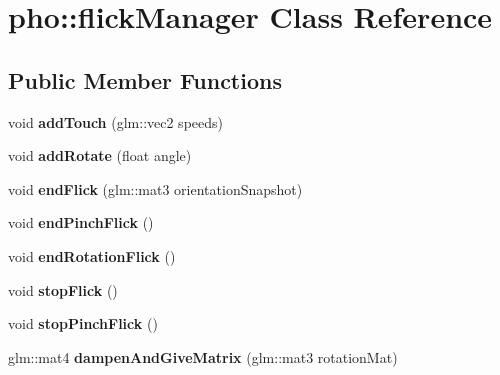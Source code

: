 \hypertarget{classpho_1_1flickManager}{\section{pho\-:\-:flick\-Manager Class Reference}
\label{classpho_1_1flickManager}
}
\subsection*{Public Member Functions}
\begin{DoxyCompactItemize}
\item 
\hypertarget{classpho_1_1flickManager_ad9f5cb98e758564c5ebc913d9aa120d1}{void {\bfseries add\-Touch} (glm\-::vec2 speeds)}\label{classpho_1_1flickManager_ad9f5cb98e758564c5ebc913d9aa120d1}

\item 
\hypertarget{classpho_1_1flickManager_a1b1df3626e566e118b936ad3e4005243}{void {\bfseries add\-Rotate} (float angle)}\label{classpho_1_1flickManager_a1b1df3626e566e118b936ad3e4005243}

\item 
\hypertarget{classpho_1_1flickManager_a653c945f19ae5a056851aa3a9ab1f805}{void {\bfseries end\-Flick} (glm\-::mat3 orientation\-Snapshot)}\label{classpho_1_1flickManager_a653c945f19ae5a056851aa3a9ab1f805}

\item 
\hypertarget{classpho_1_1flickManager_a46786fd5133be5792a9e9ffd2ba912e6}{void {\bfseries end\-Pinch\-Flick} ()}\label{classpho_1_1flickManager_a46786fd5133be5792a9e9ffd2ba912e6}

\item 
\hypertarget{classpho_1_1flickManager_abe57e168a8cf3a3f7953339fd75e143b}{void {\bfseries end\-Rotation\-Flick} ()}\label{classpho_1_1flickManager_abe57e168a8cf3a3f7953339fd75e143b}

\item 
\hypertarget{classpho_1_1flickManager_acdb07c082db311651ff014c04540abcf}{void {\bfseries stop\-Flick} ()}\label{classpho_1_1flickManager_acdb07c082db311651ff014c04540abcf}

\item 
\hypertarget{classpho_1_1flickManager_a12979db47dee255a954a8ba07e1da436}{void {\bfseries stop\-Pinch\-Flick} ()}\label{classpho_1_1flickManager_a12979db47dee255a954a8ba07e1da436}

\item 
\hypertarget{classpho_1_1flickManager_a32ec82aea2ccc84487233d25ff0c1b30}{glm\-::mat4 {\bfseries dampen\-And\-Give\-Matrix} (glm\-::mat3 rotation\-Mat)}\label{classpho_1_1flickManager_a32ec82aea2ccc84487233d25ff0c1b30}


\end{DoxyCompactItemize}
